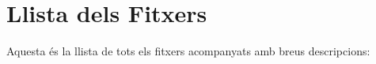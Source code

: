 \section{Llista dels Fitxers}
Aquesta és la llista de tots els fitxers acompanyats amb breus descripcions\+:\begin{DoxyCompactList}
\item{}
\item{}
\item{}
\end{DoxyCompactList}
